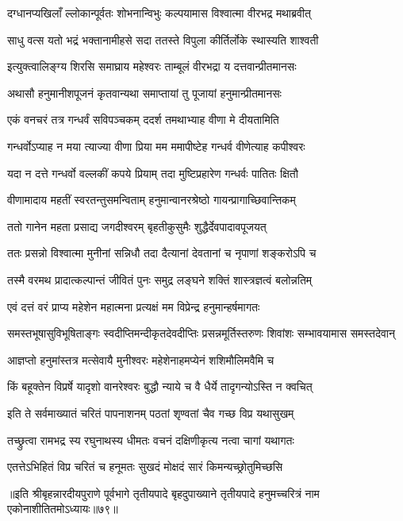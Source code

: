 \twolineshloka
{दग्धानप्यखिलाँ ल्लोकान्पूर्वतः शोभनान्विभुः}
{कल्पयामास विश्वात्मा वीरभद्र मथाब्रवीत्}%

\twolineshloka
{साधु वत्स यतो भद्रं भक्तानामीहसे सदा}
{ततस्ते विपुला कीर्तिर्लोके स्थास्यति शाश्वती}%

\twolineshloka
{इत्युक्त्वालिङ्ग्य शिरसि समाघ्राय महेश्वरः}
{ताम्बूलं वीरभद्रा य दत्तवान्प्रीतमानसः}%

\twolineshloka
{अथासौ हनुमानीशपूजनं कृतवान्यथा}
{समाप्तायां तु पूजायां हनुमान्प्रीतमानसः}%

\twolineshloka
{एकं वनचरं तत्र गन्धर्वं सविपञ्चकम्}
{ददर्श तमथाभ्याह वीणा मे दीयतामिति}%

\twolineshloka
{गन्धर्वोऽप्याह न मया त्याज्या वीणा प्रिया मम}
{ममापीष्टेह गन्धर्व वीणेत्याह कपीश्वरः}%

\twolineshloka
{यदा न दत्ते गन्धर्वो वल्लकीं कपये प्रियाम्}
{तदा मुष्टिप्रहारेण गन्धर्वः पातितः क्षितौ}%

\twolineshloka
{वीणामादाय महतीं स्वरतन्तुसमन्विताम्}
{हनुमान्वानरश्रेष्ठो गायन्प्रागाच्छिवान्तिकम्}%

\twolineshloka
{ततो गानेन महता प्रसाद्य जगदीश्वरम्}
{बृहतीकुसुमैः शुद्धैर्देवपादावपूजयत्}%

\twolineshloka
{ततः प्रसन्नो विश्वात्मा मुनीनां सन्निधौ तदा}
{दैत्यानां देवतानां च नृपाणां शङ्करोऽपि च}%

\twolineshloka
{तस्मै वरमथ प्रादात्कल्पान्तं जीवितं पुनः}
{समुद्र लङ्घने शक्तिं शास्त्रज्ञत्वं बलोन्नतिम्}%

\twolineshloka
{एवं दत्तं वरं प्राप्य महेशेन महात्मना}
{प्रत्यक्षं मम विप्रेन्द्र हनुमान्हर्षमागतः}%

\twolineshloka
{समस्तभूषासुविभूषिताङ्गः स्वदीप्तिमन्दीकृतदेवदीप्तिः}
{प्रसन्नमूर्तिस्तरुणः शिवांशः सम्भावयामास समस्तदेवान्}%

\twolineshloka
{आज्ञप्तो हनुमांस्तत्र मत्सेवायै मुनीश्वरः}
{महेशेनाहमप्येनं शशिमौलिमवैमि च}%

\twolineshloka
{किं बहूक्तेन विप्रर्षे यादृशो वानरेश्वरः}
{बुद्धौ न्याये च वै धैर्ये तादृगन्योऽस्ति न क्वचित्}%

\twolineshloka
{इति ते सर्वमाख्यातं चरितं पापनाशनम्}
{पठतां शृण्वतां चैव गच्छ विप्र यथासुखम्}%

\twolineshloka
{तच्छ्रुत्वा रामभद्र स्य रघुनाथस्य धीमतः}
{वचनं दक्षिणीकृत्य नत्वा चागां यथागतः}%

\twolineshloka
{एतत्तेऽभिहितं विप्र चरितं च हनूमतः}
{सुखदं मोक्षदं सारं किमन्यच्छ्रोतुमिच्छसि}%

॥इति श्रीबृहन्नारदीयपुराणे पूर्वभागे तृतीयपादे बृहदुपाख्याने तृतीयपादे हनुमच्चरित्रं नाम एकोनाशीतितमोऽध्यायः॥७९॥

\closesection